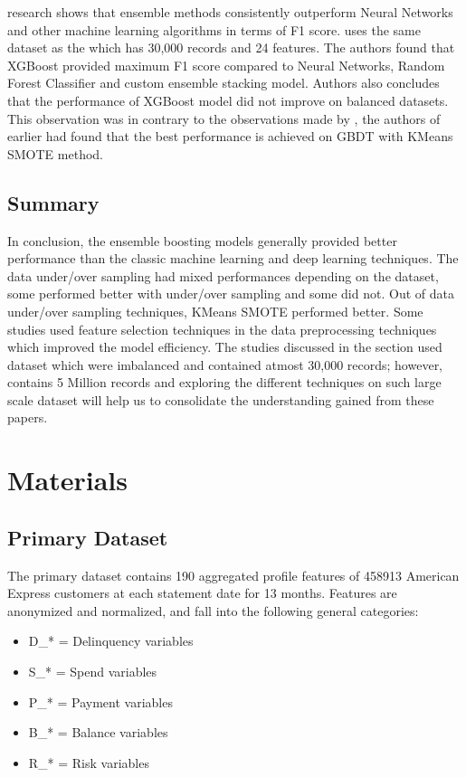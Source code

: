 \documentclass[twoside,11pt,a4paper]{article}
\begin{document}
\citep{faraj2021comparison} research shows that ensemble  methods  consistently  outperform  Neural  Networks  and  other  machine  learning algorithms in terms of F1 score. \citep{faraj2021comparison} uses the same dataset as the \citep{sayjadah2018credit} which has 30,000 records and 24 features. The authors found that \acs{XGBoost} provided maximum F1 score compared to Neural Networks, Random Forest Classifier and custom ensemble stacking model. Authors also concludes that the performance of \acs{XGBoost} model did not improve on balanced datasets. This observation was in contrary to the observations made by \citep{emil2019enhancing}, the authors of earlier had found that the best performance is achieved on \acs{GBDT} with KMeans \acs{SMOTE} method.

\subsection{Summary}
In conclusion, the ensemble boosting models generally provided better performance than the classic machine learning and deep learning techniques. The data under/over sampling had mixed performances depending on the dataset, some performed better with under/over sampling and some did not. Out of data under/over sampling techniques, KMeans \acs{SMOTE} performed better. Some studies used feature selection techniques in the data preprocessing techniques which improved the model efficiency. The studies discussed in the section used dataset which were imbalanced and  contained atmost 30,000 records; however, \citep{amex-default-prediction-dataset} contains 5 Million records and exploring the different techniques on such large scale dataset will help us to consolidate the understanding gained from these papers.


\section{Materials}\label{sec:materials}

\subsection{Primary Dataset}
The primary dataset contains 190 aggregated profile features of 458913 American Express customers at each statement date for 13 months. Features are anonymized and normalized, and fall into the following general categories:

\begin{itemize}
	\item D\_* = Delinquency variables
	\item S\_* = Spend variables
	\item P\_* = Payment variables
	\item B\_* = Balance variables
	\item R\_* = Risk variables	
\end{itemize}
\end{document}

